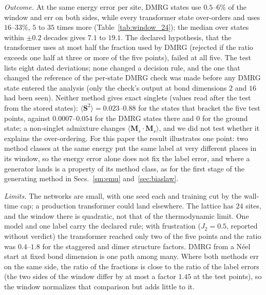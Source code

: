 \documentclass[aps,prx,onecolumn,10pt,nofootinbib,longbibliography,floatfix]{revtex4-2}
\theoremstyle{remark}
\begin{document}
\emph{Outcome.} At the same energy error per site, DMRG states use $0.5$--$6\%$ of the window and err on both sides, %
while every transformer state over-orders and uses $16$--$33\%$, $5$ to $35$ times more (Table~\ref{tab:window_24}); %
the median over states within $\pm0.2$ decades gives $7.1$ to $19.1$. The declared hypothesis, that the transformer %
uses at most half the fraction used by DMRG (rejected if the ratio exceeds one half at three or more of the five
points), failed at all five. %
The test lists eight dated deviations; none changed a decision rule, and the one that changed the reference of the
per-state DMRG check was made before any DMRG state entered the analysis (only the check's output at bond dimensions %
$2$ and $16$ had been seen). Neither method gives exact singlets (values read after the test from the stored states): $\langle\bm S^2\rangle=0.023$--$0.88$ for the %
states that bracket the five test points, against $0.0007$--$0.054$ for the DMRG states there and $0$ for the ground %
state; a non-singlet admixture changes $\langle\bm M_s\cdot\bm M_s\rangle$, and we did not test whether it explains
the over-ordering. For this paper the result illustrates one point: two method
classes at the same energy put the same label at very different places in its window, so the energy error alone does
not fix the label error, and where a generator lands is a property of its method class, as for the first stage of the
generating method in Secs.~\ref{sm:emu} and~\ref{sec:biaslaw}.

\emph{Limits.} The networks are small, with one seed each and training cut by the wall-time cap; a production
transformer could land elsewhere. The lattice has $24$ sites, and the window there is quadratic, not that of the %
thermodynamic limit. One model and one label carry the declared rule; with frustration ($J_2=0.5$, reported without %
verdict) the transformer reached only two of the five points and the ratio was $0.4$--$1.8$ for the staggered and %
dimer structure factors. DMRG from a N\'eel start at fixed bond dimension is one path among many. Where both methods
err on the same side, the ratio of the fractions is close to the ratio of the label errors (the two sides of the
window differ by at most a factor $1.45$ at the test points), so the window normalizes that comparison but adds little %
to it.
\end{document}
